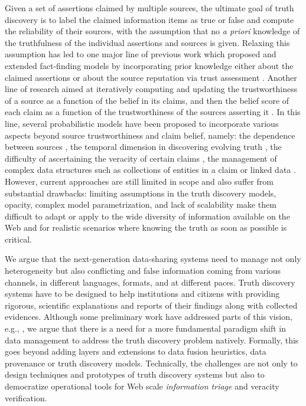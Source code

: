 \documentclass[prodmode,acmtecs]{acmsmall} %
\begin{document}
Given a set of assertions claimed by multiple sources, the ultimate goal of 
truth discovery is to label the claimed information items as true or false and compute the reliability of 
their sources, with the assumption that no  {\it a priori} knowledge of the truthfulness of the individual assertions and sources is given. 
Relaxing this assumption has led to one major line of previous work which proposed and extended fact-finding 
models by incorporating prior knowledge either about the claimed assertions \cite{PasternackR13} or about the source 
reputation via trust assessment \cite{BalakrishnanK11}. Another line of research aimed at iteratively computing 
and updating the trustworthiness of a source as a function of the belief in its claims, and then the belief score of each 
claim as a function of the trustworthiness of the 
sources asserting it \cite{YinHY08}. In this line, several probabilistic models have been proposed to incorporate various aspects beyond source 
trustworthiness and claim belief, namely: the dependence between sources \cite{DongBHS10a}, the temporal 
dimension in discovering evolving truth  \cite{DongBS09a}, the difficulty of ascertaining the veracity of certain claims \cite{GallandAMS10}, 
the management of complex  data structures such as collections of entities in a claim \cite{ZhaoRGH12} or linked data \cite{GoasdoueKKLMZ13}.
 However, current approaches are still limited in scope and also suffer from substantial drawbacks: limiting  
 assumptions in the truth discovery models, opacity, complex model parametrization, and lack of scalability  make them difficult to adapt or apply to the 
 wide diversity of information available on the Web and for realistic scenarios where knowing the truth as soon as possible is critical. 




 We argue that the next-generation data-sharing systems need to manage not only heterogeneity but also conflicting and false 
 information  coming from various channels, in different languages, formats, and at different paces. Truth discovery systems  have to be designed to help institutions and citizens with providing rigorous, scientific explanations and reports 
 of their findings along with collected evidences. %
  Although some preliminary work have addressed parts of this vision, e.g., \cite{DongS2013,DongBHS10a,LiDLMS12}, we argue that there is a need for a more fundamental paradigm shift in data management  to address the truth discovery problem natively. Formally, this goes beyond adding layers and extensions to data fusion heuristics, data provenance or truth discovery models. Technically, the challenges are not only to  design techniques and prototypes of truth discovery systems but also to democratize operational tools for Web scale {\it information  triage} and veracity verification.
  
\end{document}
